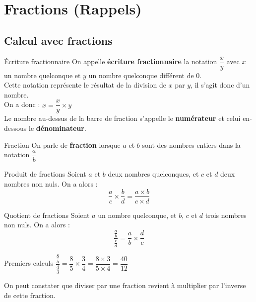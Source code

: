 \documentclass[oneside,12pt]{article}          %
\begin{document}
\section{Fractions (Rappels)}

\subsection{Calcul avec fractions}

\begin{definition}{Écriture fractionnaire} 
	On appelle \textbf{écriture fractionnaire} la notation $\dfrac{x}{y}$ avec $x$ un nombre quelconque et $y$ un nombre quelconque différent de $0$. \\
	Cette notation représente le résultat de la division de $x$ par $y$, il s'agit donc d'un nombre. \\
	On a donc : $x = \dfrac{x}{y} \times y$ \\
	Le nombre au-dessus de la barre de fraction s'appelle le \textbf{numérateur} et celui en-dessous le \textbf{dénominateur}.
\end{definition}



\begin{definition}{Fraction}
	On parle de \textbf{fraction} lorsque $a$ et $b$ sont des nombres entiers dans la notation $\dfrac{a}{b}$
\end{definition}



\begin{propriete}{Produit de fractions}
	Soient $a$ et $b$ deux nombres quelconques, et $c$ et $d$ deux nombres non nuls. On a alors : 
	\[ \dfrac{a}{c} \times \dfrac{b}{d} = \dfrac{a \times b}{c \times d}\]
\end{propriete}



\begin{propriete}{Quotient de fractions}
	Soient $a$ un nombre quelconque, et $b$, $c$ et $d$ trois nombres non nuls. On a alors : 
	\[ \dfrac{\frac{a}{b}}{\frac{c}{d}} = \dfrac{a}{b} \times \dfrac{d}{c} \]
\end{propriete}



\begin{minipage}{0.5\textwidth}
	\begin{exemple}{Premiers calculs}
		$\dfrac{\frac{8}{5}}{\frac{4}{3}} = \dfrac{8}{5} \times \dfrac{3}{4} = \dfrac{8 \times 3}{5 \times 4} = \dfrac{40}{12}$
	\end{exemple}
\end{minipage}
\begin{minipage}{0.5\textwidth}
	\begin{remarque}
		On peut constater que diviser par une fraction revient à multiplier par l'inverse de cette fraction.
	\end{remarque}
\end{minipage}
\end{document}
